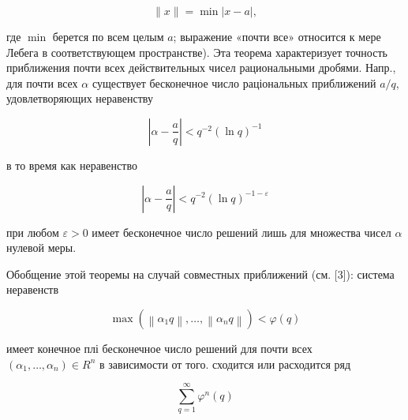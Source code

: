 \documentclass[10pt]{article}
\begin{document}
\[

\|x\|=\min |x-a|,

\]



где $\min$ берется по всем целым $a$; выражение «почти все» относится к мере Лебега в соответствующем пространстве). Эта теорема характеризует точность приближения почти всех действительных чисел рациональными дробями. Напр., для почти всех $\alpha$ существует бесконечное число раціональных приближений $a / q$, удовлетворяющих неравенству



\[

\left|\alpha-\frac{a}{q}\right|<q^{-2}(\ln q)^{-1}

\]



в то время как неравенство



\[

\left|\alpha-\frac{a}{q}\right|<q^{-2}(\ln q)^{-1-\varepsilon}

\]



при любом $\varepsilon>0$ имеет бесконечное число решений лишь для множества чисел $\alpha$ нулевой меры.



Обобщение этой теоремы на случай совместных приближений (см. [3]): система неравенств



\[

\max \left(\left\|\alpha_{1} q\right\|, \ldots,\left\|\alpha_{n} q\right\|\right)<\varphi(q)

\]



имеет конечное плі бесконечное число решений для почти всех $\left(\alpha_{1}, \ldots, \alpha_{n}\right) \in R^{n}$ в зависимости от того. сходится или расходится ряд



\[

\sum_{q=1}^{\infty} \varphi^{n}(q)

\]
\end{document}
